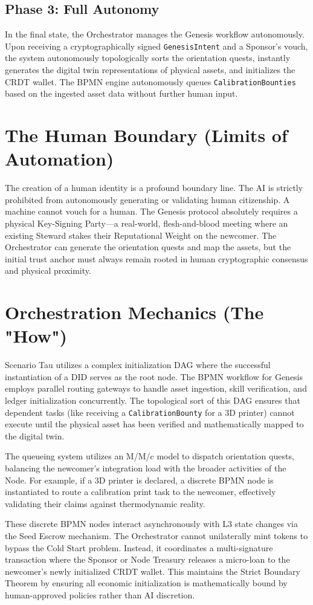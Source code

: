 \subsection{Phase 3: Full Autonomy}
In the final state, the Orchestrator manages the Genesis workflow autonomously. Upon receiving a cryptographically signed \texttt{GenesisIntent} and a Sponsor's vouch, the system autonomously topologically sorts the orientation quests, instantly generates the digital twin representations of physical assets, and initializes the CRDT wallet. The BPMN engine autonomously queues \texttt{CalibrationBounties} based on the ingested asset data without further human input.

\section{The Human Boundary (Limits of Automation)}
The creation of a human identity is a profound boundary line. The AI is strictly prohibited from autonomously generating or validating human citizenship. A machine cannot vouch for a human. The Genesis protocol absolutely requires a physical Key-Signing Party—a real-world, flesh-and-blood meeting where an existing Steward stakes their Reputational Weight on the newcomer. The Orchestrator can generate the orientation quests and map the assets, but the initial trust anchor must always remain rooted in human cryptographic consensus and physical proximity.

\section{Orchestration Mechanics (The "How")}
Scenario Tau utilizes a complex initialization DAG where the successful instantiation of a DID serves as the root node. The BPMN workflow for Genesis employs parallel routing gateways to handle asset ingestion, skill verification, and ledger initialization concurrently. The topological sort of this DAG ensures that dependent tasks (like receiving a \texttt{CalibrationBounty} for a 3D printer) cannot execute until the physical asset has been verified and mathematically mapped to the digital twin.

The queueing system utilizes an M/M/c model to dispatch orientation quests, balancing the newcomer's integration load with the broader activities of the Node. For example, if a 3D printer is declared, a discrete BPMN node is instantiated to route a calibration print task to the newcomer, effectively validating their claims against thermodynamic reality.

These discrete BPMN nodes interact asynchronously with L3 state changes via the Seed Escrow mechanism. The Orchestrator cannot unilaterally mint tokens to bypass the Cold Start problem. Instead, it coordinates a multi-signature transaction where the Sponsor or Node Treasury releases a micro-loan to the newcomer's newly initialized CRDT wallet. This maintains the Strict Boundary Theorem by ensuring all economic initialization is mathematically bound by human-approved policies rather than AI discretion.

